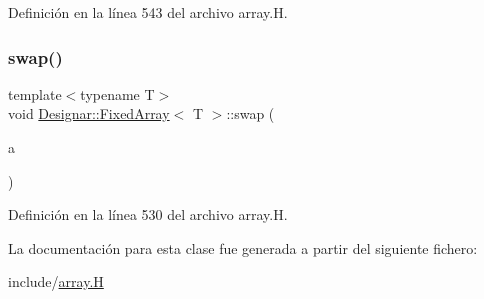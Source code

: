 Definición en la línea 543 del archivo array.\+H.

\mbox{\label{class_designar_1_1_fixed_array_ab13ae0d1146e753d3e1128e1cce07d91}} 
\subsubsection{\texorpdfstring{swap()}{swap()}}
{\footnotesize\ttfamily template$<$typename T$>$ \\
void \hyperlink{class_designar_1_1_fixed_array}{Designar\+::\+Fixed\+Array}$<$ T $>$\+::swap (\begin{DoxyParamCaption}\item[{\hyperlink{class_designar_1_1_fixed_array}{Fixed\+Array}$<$ T $>$ \&}]{a }\end{DoxyParamCaption})\hspace{0.3cm}{\ttfamily [inline]}}



Definición en la línea 530 del archivo array.\+H.



La documentación para esta clase fue generada a partir del siguiente fichero\+:\begin{DoxyCompactItemize}
\item 
include/\hyperlink{array_8_h}{array.\+H}\end{DoxyCompactItemize}
